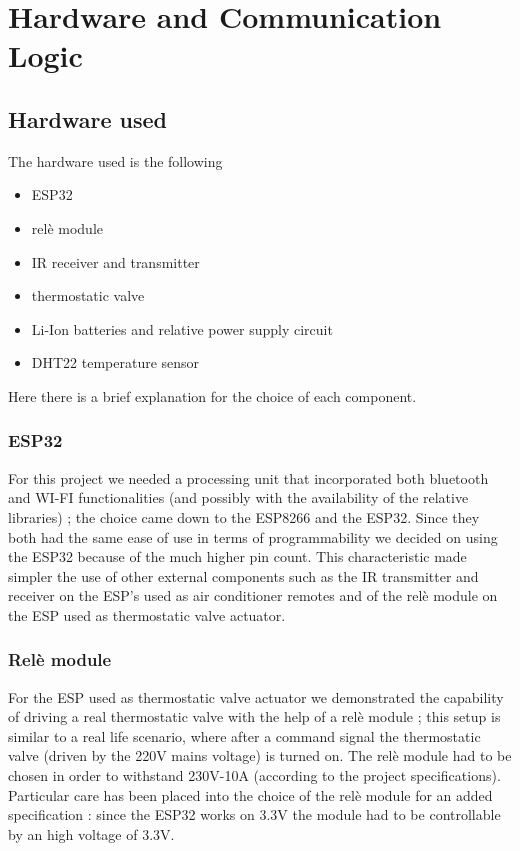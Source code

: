 \documentclass[a4paper]{article}
\begin{document}
    \section{Hardware and Communication Logic}

        \subsection{Hardware used}
        The hardware used is the following
        \begin{itemize}
            \item ESP32
            \item relè module
            \item IR receiver and transmitter
            \item thermostatic valve
            \item Li-Ion batteries and relative power supply circuit 
            \item DHT22 temperature sensor
        \end{itemize}
        Here there is a brief explanation for the choice of each component.
        
        \subsubsection{ESP32}
        For this project we needed a processing unit that incorporated both bluetooth and WI-FI functionalities (and possibly with the availability of the relative libraries) ; the choice came down to the ESP8266 and the ESP32. Since they both had the same ease of use in terms of programmability we decided on using the ESP32 because of the much higher pin count. This characteristic made simpler the use of other external components such as the IR transmitter and receiver on the ESP's used as air conditioner remotes and of the relè module on the ESP used as thermostatic valve actuator. 
        
        \subsubsection{Relè module}
        For the ESP used as thermostatic valve actuator we demonstrated the capability of driving a real thermostatic valve with the help of a relè module ; this setup is similar to a real life scenario, where after a command signal the thermostatic valve (driven by the 220V mains voltage) is turned on. The relè module had to be chosen in order to withstand 230V-10A (according to the project specifications). Particular care has been placed into the choice of the relè module for an added specification : since the ESP32 works on 3.3V the module had to be controllable by an high voltage of 3.3V.
        
\end{document}
